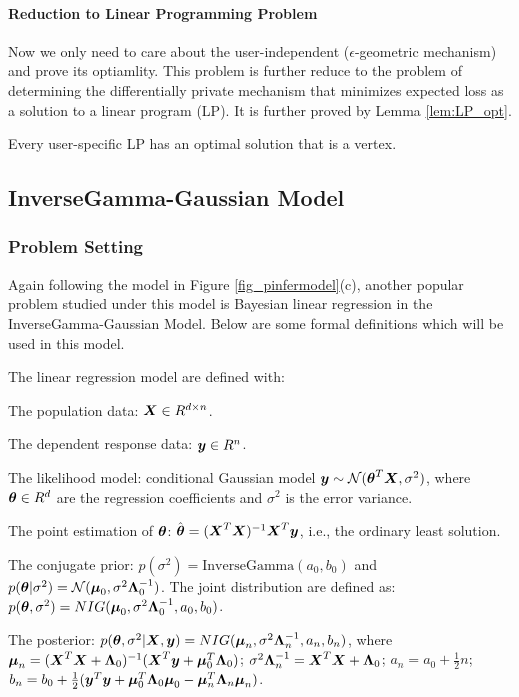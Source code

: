 \documentclass{article}
\begin{document}
\paragraph{Reduction to Linear Programming Problem}
Now we only need to care about the user-independent ($\epsilon$-geometric mechanism) and prove its optiamlity. 
This problem is further reduce to the problem of determining the differentially private mechanism that minimizes expected loss as a solution to a linear program (LP). It is further proved by Lemma \ref{lem:LP_opt}.
\begin{lem}
\label{lem:LP_opt}
Every user-specific LP has an optimal solution that is a vertex.
\end{lem}

\subsection{InverseGamma-Gaussian Model
\texorpdfstring{\cite{bernstein2019differentially}}{}}
%
\subsubsection{Problem Setting}
%
Again following the model in Figure \ref{fig_pinfermodel}(c), another popular problem studied under this model is Bayesian linear regression in the InverseGamma-Gaussian Model. 
%
Below are some formal definitions which will be used in this model.

%
\begin{defn}
The linear regression model are defined with:

The population data: $\boldsymbol{X} \in R^{d \times n}$.

The dependent response data: $\boldsymbol{y} \in R^{n}$.

The likelihood model: conditional Gaussian model 
$\boldsymbol{y} \sim \mathcal{N}(\boldsymbol{\theta}^{T} \boldsymbol{X}, \sigma^2)$,
where $\boldsymbol{\theta} \in R^d$ are the regression coefficients and
$\sigma^2$ is the error variance.

The point estimation of $\boldsymbol{\theta}$: 
$\hat{\boldsymbol{\theta}} = (\boldsymbol{X}^T \boldsymbol{X})^{-1} \boldsymbol{X}^T \boldsymbol{y}$, 
i.e., the ordinary least solution.

The conjugate prior: $p(\sigma^2) = \text{InverseGamma}(a_0, b_0 )$ 
and $p(\boldsymbol{\theta} | \sigma^2) = \mathcal{N} (\boldsymbol{\mu}_0 , \sigma^2\boldsymbol{\Lambda}_0^{-1})$. 
The joint distribution are defined as:
$p(\boldsymbol{\theta}, \sigma^2) = NIG(\boldsymbol{\mu}_0, \sigma^2\boldsymbol{\Lambda}_0^{-1}, a_0, b_0)$.

The posterior: 
$p(\boldsymbol{\theta}, \sigma^2 | \boldsymbol{X}, \boldsymbol{y}) = 
NIG (\boldsymbol{\mu}_n, \sigma^2\boldsymbol{\Lambda}_n^{-1}, a_n, b_n)$, where 
$\boldsymbol{\mu}_n = (\boldsymbol{X}^T \boldsymbol{X} + \boldsymbol{\Lambda}_0)^{-1}
(\boldsymbol{X}^T \boldsymbol{y} + \boldsymbol{\mu}_0^{T}\boldsymbol{\Lambda}_0)$;
$\sigma^2\boldsymbol{\Lambda}_n^{-1} = \boldsymbol{X}^T \boldsymbol{X} + \boldsymbol{\Lambda}_0$;
$a_n = a_0 + \frac{1}{2}n$;
$b_n = b_0 + \frac{1}{2}(\boldsymbol{y}^T\boldsymbol{y} 
+ \boldsymbol{\mu}_0^{T}\boldsymbol{\Lambda}_0 \boldsymbol{\mu}_0
- \boldsymbol{\mu}_n^{T}\boldsymbol{\Lambda}_n \boldsymbol{\mu}_n)$.
\end{defn}
\end{document}
